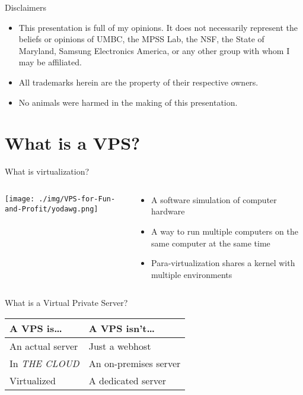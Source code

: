 \documentclass[presentation,aspectratio=169]{beamer}
\begin{document}
\begin{frame}[label=sec-1-0-3]{Disclaimers}
\begin{itemize}
\item This presentation is full of my opinions. It does not necessarily represent 
the beliefs or opinions of UMBC, the MPSS Lab, the NSF, the State of 
Maryland, Samsung Electronics America, or any other group with whom I may be 
affiliated.
\item All trademarks herein are the property of their respective owners.
\item No animals were harmed in the making of this presentation.
\end{itemize}
\end{frame}
\section{What is a VPS?}
\label{sec-2}
\begin{frame}[label=sec-2-0-1]{What is virtualization?}
\begin{columns}
\begin{column}{0.45\textwidth}

\texttt{[image: ./img/VPS-for-Fun-and-Profit/yodawg.png]}
\end{column}

\begin{column}{0.45\textwidth}

\begin{itemize}
\item A software simulation of computer hardware
\item A way to run multiple computers on the same computer at the same time
\item Para-virtualization shares a kernel with multiple environments
\end{itemize}
\end{column}
\end{columns}
\end{frame}

\begin{frame}[label=sec-2-0-2]{What is a Virtual Private Server?}
\begin{Large}
\begin{center}
\begin{tabular}{ll}
A VPS is\ldots{} & A VPS isn't\ldots{}\\
\hline
An actual server & Just a webhost\\
In \emph{THE CLOUD} & An on-premises server\\
Virtualized & A dedicated server\\
\end{tabular}
\end{center}
\end{Large}
\end{frame}
\end{document}
